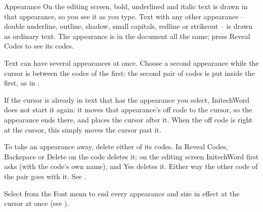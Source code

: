 \begin{Feature}{Appearance}
\Notes
{}
On the editing screen, bold, underlined and italic text is drawn in that
appearance, so you see it as you type.  Text with any other appearance --
double underline, outline, shadow, small capitals, redline or strikeout --
is drawn as ordinary text.  The appearance is in the document all the same;
press Reveal Codes to see its codes.

Text can have several appearances at once.  Choose a second appearance
while the cursor is between the codes of the first: the second pair of codes
is put inside the first, as in .

If the cursor is already in text that has the appearance you select,
InitechWord does not start it again: it moves that appearance's off code to
the cursor, so the appearance ends there, and places the cursor after it.
When the off code is right at the cursor, this simply moves the cursor past
it.

To take an appearance away, delete either of its codes.  In Reveal Codes,
Backspace or Delete on the code deletes it; on the editing screen
InitechWord first asks  (with the code's own
name), and Yes deletes it.  Either way the other code of the pair goes with
it.  See .

Select  from the Font menu to end every appearance and size in
effect at the cursor at once (see ).

\end{Feature}
